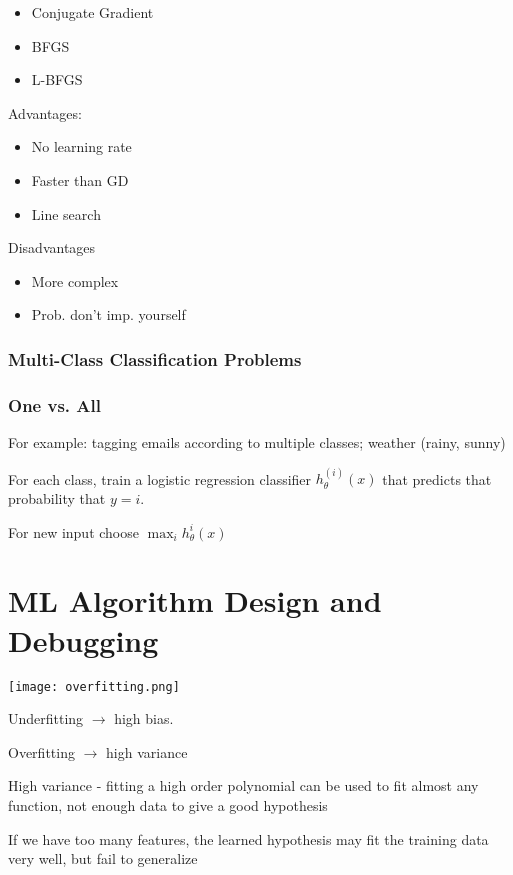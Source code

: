 \begin{itemize}
\item Conjugate Gradient
\item BFGS
\item L-BFGS
\end{itemize}

Advantages:
\begin{itemize}
\item No learning rate
\item Faster than GD
\item Line search
\end{itemize}

Disadvantages
\begin{itemize}
\item More complex
\item Prob. don't imp. yourself
\end{itemize}

\subsubsection{Multi-Class Classification Problems}

\subsubsection{One vs. All}

For example: tagging emails according to multiple classes; weather (rainy, sunny)

For each class, train a logistic regression classifier $h_{\theta}^{(i)}(x)$ that predicts that probability that $y=i$.

For new input choose $\max_ih_\theta^i(x)$

\section{ML Algorithm Design and Debugging}

\texttt{[image: overfitting.png]}

Underfitting $\rightarrow$ high bias.

Overfitting $\rightarrow$  high variance

High variance - fitting a high order polynomial can be used to fit almost any function, not enough data to give a good hypothesis

If we have too many features, the learned hypothesis may fit the training data very well, but fail to generalize

